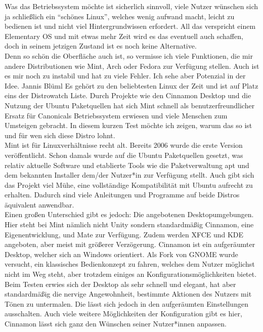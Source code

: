 {{		Was das Betriebssystem möchte ist sicherlich sinnvoll, viele Nutzer wünschen sich ja schließlich ein "`schönes Linux"', welches wenig aufwand macht, leicht zu bedienen ist und nicht viel Hintergrundwissen erfordert. All das verspricht einem Elementary OS und mit etwas mehr Zeit wird es das eventuell auch schaffen, doch in seinem jetzigen Zustand ist es noch keine Alternative. \\
		Denn so schön die Oberfläche auch ist, so vermisse ich viele Funktionen, die mir andere Distributionen wie Mint, Arch oder Fedora zur Verfügung stellen. Auch ist es mir noch zu instabil und hat zu viele Fehler. Ich sehe aber Potenzial in der Idee. }
	{Jannis Blüml}
	{Es gehört zu den beliebtesten Linux der Zeit und ist auf Platz eins der Distrowatch Liste. Durch Projekte wie den Cinnamon Desktop und
		die Nutzung der Ubuntu Paketquellen hat sich Mint schnell als benutzerfreundlicher Ersatz für Canonicals Betriebssystem erwiesen
		und viele Menschen zum Umsteigen gebracht. In diesem kurzen Test möchte ich zeigen, warum das so ist und für wen sich diese Distro lohnt.\\
		Mint ist für Linuxverhältnisse recht alt. Bereits 2006 wurde die erste Version veröffentlicht. Schon damals wurde auf die Ubuntu Paketquellen
		gesetzt, was relativ aktuelle Software und etablierte Tools wie die Paketverwaltung apt und dem bekannten Installer
		dem/der Nutzer*in zur Verfügung stellt. Auch gibt sich das Projekt viel Mühe, eine vollständige Kompatibilität mit Ubuntu aufrecht zu erhalten.
		Dadurch sind viele Anleitungen und Programme auf beide Distros
		äquivalent anwendbar.\\
		Einen großen Unterschied gibt es jedoch: Die angebotenen Desktopumgebungen. Hier steht bei Mint nämlich nicht Unity sondern standardmäßig
		Cinnamon, eine Eigenentwicklung, und Mate zur Verfügung. Zudem werden XFCE und KDE angeboten, aber meist mit größerer Verzögerung.
		Cinnamon ist ein aufgeräumter Desktop, welcher sich an Windows orientiert. Als Fork von GNOME wurde versucht, ein klassisches Bedienkonzept
		zu fahren, welches dem Nutzer möglichst nicht im Weg steht, aber trotzdem einiges an Konfigurationsmöglichkeiten bietet. Beim Testen erwies
		sich der Desktop als sehr schnell und elegant, hat aber standardmäßig die nervige Angewohnheit, bestimmte Aktionen des Nutzers mit Tönen zu
		untermalen. Die lässt sich jedoch in den aufgeräumten Einstellungen ausschalten. Auch viele weitere Möglichkeiten der Konfiguration gibt es
		hier, Cinnamon lässt sich ganz den Wünschen seiner Nutzer*innen anpassen.\\
}}

